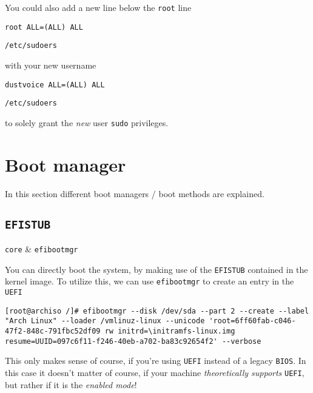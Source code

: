 \documentclass[10pt]{dustdoc}
\begin{document}
You could also add a new line below the \texttt{root} line

\begin{mintedlisting}
    \begin{verbatim}
root ALL=(ALL) ALL
    \end{verbatim}

    \caption{\texttt{/etc/sudoers}}
\end{mintedlisting}

\noindent
with your new username

\begin{mintedlisting}
    \begin{verbatim}
dustvoice ALL=(ALL) ALL
    \end{verbatim}

    \caption{\texttt{/etc/sudoers}}
\end{mintedlisting}

\noindent
to solely grant the \emph{new} user \texttt{sudo} privileges.

\section{Boot manager}
\label{sec:boot-manager}

In this section different boot managers / boot methods are explained.

\subsection{\texttt{EFISTUB}}
\label{sec:efistub}

\begin{packagetable}
    \texttt{core} & \texttt{efibootmgr} \\
\end{packagetable}

You can directly boot the system, by making use of the \texttt{EFISTUB} contained in the kernel image.
To utilize this, we can use \texttt{efibootmgr} to create an entry in the \texttt{UEFI}

\begin{verbatim}
[root@archiso /]# efibootmgr --disk /dev/sda --part 2 --create --label "Arch Linux" --loader /vmlinuz-linux --unicode 'root=6ff60fab-c046-47f2-848c-791fbc52df09 rw initrd=\initramfs-linux.img resume=UUID=097c6f11-f246-40eb-a702-ba83c92654f2' --verbose
\end{verbatim}

\begin{NOTE}
    This only makes sense of course, if you're using \texttt{UEFI} instead of a legacy \texttt{BIOS}.
    In this case it doesn't matter of course, if your machine \emph{theoretically supports} \texttt{UEFI}, but rather if it is the \emph{enabled mode}!
\end{NOTE}
\end{document}

